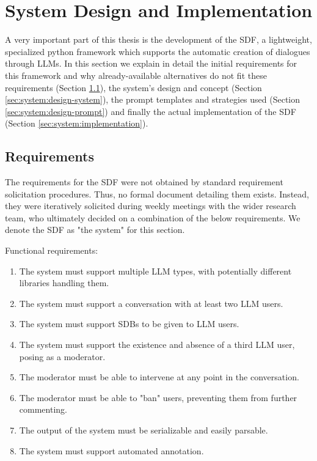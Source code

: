 %
\chapter{System Design and Implementation}
\label{sec:system}

A very important part of this thesis is the development of the \ac{SDF}, a lightweight, specialized python framework which supports the automatic creation of dialogues through LLMs. In this section we explain in detail the initial requirements for this framework and why already-available alternatives do not fit these requirements (Section \ref{sec:system:requirements}), the system's design and concept (Section \ref{sec:system:design-system}), the prompt templates and strategies used (Section \ref{sec:system:design-prompt}) and finally the actual implementation of the \ac{SDF} (Section \ref{sec:system:implementation}).

\section{Requirements}
\label{sec:system:requirements}

The requirements for the \ac{SDF} were not obtained by standard requirement solicitation procedures.  Thus, no formal document detailing them exists. Instead, they were iteratively solicited during weekly meetings with the wider research team, who ultimately decided on a combination of the below requirements. We denote the \ac{SDF} as "the system" for this section.

Functional requirements:
\begin{enumerate}
	\item The system must support multiple LLM types, with potentially different libraries handling them.
	\item The system must support a conversation with at least two LLM users.
	\item The system must support \acp{SDB} to be given to LLM users.
	\item The system must support the existence and absence of a third LLM user, posing as a moderator.
	\item The moderator must be able to intervene at any point in the conversation.
	\item The moderator must be able to "ban" users, preventing them from further commenting.
	\item The output of the system must be serializable and easily parsable.
	\item The system must support automated annotation.
\end{enumerate}

